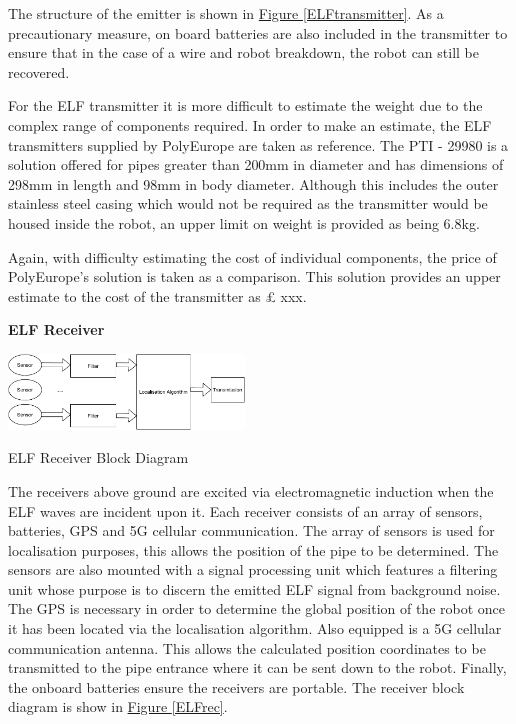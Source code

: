 \documentclass[11pt]{article}		%
\newcommand{\figref}[1]{\hyperref[#1]{Figure \ref*{#1}}}    %
\begin{document}
	        \hspace*{3ex}The structure of the emitter is shown in \figref{ELFtransmitter}. 
	        As a precautionary measure, on board batteries are also included in the transmitter to ensure that in the case of a wire and robot breakdown, the robot can still be recovered.    

			For the ELF transmitter it is more difficult to estimate the weight due to the complex range of components required. In order to make an estimate, the ELF transmitters supplied by PolyEurope are taken as reference. The PTI - 29980 is a solution offered for pipes greater than 200mm in diameter and has dimensions of 298mm in length and 98mm in body diameter. Although this includes the outer stainless steel casing which would not be required as the transmitter would be housed inside the robot, an upper limit on weight is provided as being 6.8kg.\\
			\begin{floatingfigure}[r]{0pt} \end{floatingfigure}
		    \hspace*{3ex}Again, with difficulty estimating the cost of individual components, the price of PolyEurope’s solution is taken as a comparison. This solution provides an upper estimate to the cost of the transmitter as £ xxx. 
			
			\textbf{ELF Receiver}
			
			\begin{floatingfigure}[r]{0.5\textwidth}
				\centering
				\includegraphics[width=0.47\textwidth]{blockreceiever}
				\caption{ELF Receiver Block Diagram}
				\label{ELFrec}
			\end{floatingfigure}
			The receivers above ground are excited via electromagnetic induction when the ELF waves are incident upon it. Each receiver consists of an array of sensors, batteries, GPS and 5G cellular communication. The array of sensors is used for localisation purposes, this allows the position of the pipe to be determined. The sensors are also mounted with a signal processing unit which features a filtering unit whose purpose is to discern the emitted ELF signal from background noise. The GPS is necessary in order to determine the global position of the robot once it has been located via the localisation algorithm. Also equipped is a 5G cellular communication antenna. This allows the calculated position coordinates to be transmitted to the pipe entrance where it can be sent down to the robot.  Finally, the onboard batteries ensure the receivers are portable. The receiver block diagram is show in \figref{ELFrec}.
		    
\end{document}
